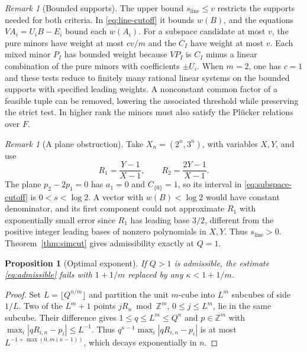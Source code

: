\documentclass[11pt,a4paper,reqno]{amsart}
\newtheorem{proposition}[theorem]{Proposition}
\theoremstyle{definition}
\theoremstyle{remark}
\newtheorem{remark}[theorem]{Remark}
\numberwithin{equation}{section}
\begin{document}
\begin{remark}[Bounded supports]\label{rem:cutoff-supports}
The upper bound \(s_{\mathrm{line}}\le v\) restricts the supports
needed for both criteria. In \eqref{eq:line-cutoff} it bounds
\(w(B)\), and the equations \(VA_i=U_iB-E_i\) bound each \(w(A_i)\).
For a subspace candidate at most \(v\), the pure minors have weight
at most \(cv/m\) and the \(C_I\) have weight at most \(v\).
Each mixed minor \(P_I\) has bounded weight because \(VP_I\)
is \(C_I\) minus a linear combination of the pure minors with
coefficients \(\pm U_i\).
When \(m=2\), one has \(c=1\) and these tests reduce to finitely
many rational linear systems on the bounded supports with specified
leading weights. A nonconstant common factor of a feasible tuple
can be removed, lowering the associated threshold while preserving
the strict test. In higher rank the minors must also satisfy the
Pl\"ucker relations over \(F\).
\end{remark}

\begin{remark}[A plane obstruction]\label{rem:plane-obstruction}
Take \(X_n=(2^n,3^n)\), with variables \(X,Y\), and use
\[
 R_1=\frac{Y-1}{X-1},\qquad R_2=\frac{2Y-1}{X-1}.
\]
The plane \(p_2-2p_1=0\) has \(a_1=0\) and \(C_{\{0\}}=1\),
so its interval in \eqref{eq:subspace-cutoff} is
\(0<s<\log2\). A vector with \(w(B)<\log2\) would have constant
denominator, and its first component could not approximate \(R_1\)
with exponentially small error since \(R_1\) has leading base
\(3/2\), different from the positive integer leading bases of
nonzero polynomials in \(X,Y\). Thus \(s_{\mathrm{line}}>0\).
Theorem~\ref{thm:simcut} gives admissibility exactly at \(Q=1\).
\end{remark}

\begin{proposition}[Optimal exponent]\label{prop:optimal-exponent}
If \(Q>1\) is admissible, the estimate \eqref{eq:admissible}
fails with \(1+1/m\) replaced by any \(\kappa<1+1/m\).
\end{proposition}

\begin{proof}
Set \(L=\lfloor Q^{n/m}\rfloor\) and partition the unit \(m\)-cube
into \(L^m\) subcubes of side \(1/L\). Two of the \(L^m+1\)
points \(jR_n\bmod\mathbb Z^m\), \(0\le j\le L^m\), lie in the
same subcube. Their difference gives \(1\le q\le L^m\le Q^n\)
and \(p\in\mathbb Z^m\) with \(\max_i|qR_{i,n}-p_i|\le L^{-1}\).
Thus \(q^{\kappa-1}\max_i|qR_{i,n}-p_i|\) is at most
\(L^{-1+\max(0,m(\kappa-1))}\), which decays exponentially in \(n\).
\end{proof}
\end{document}
